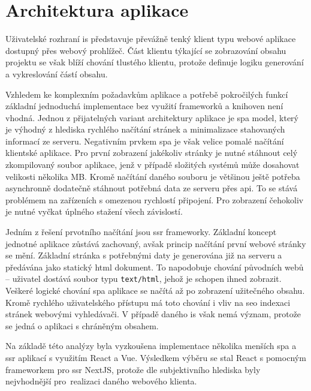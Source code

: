 

\section{Architektura aplikace}

Uživatelské rozhraní \gls{is} představuje převážně tenký klient typu webové aplikace dostupný přes webový prohlížeč. Část klientu týkající se zobrazování obsahu projektu se však blíží chování tlustého klientu, protože definuje logiku generování a vykreslování částí obsahu.

Vzhledem ke komplexním požadavkům aplikace a potřebě pokročilých funkcí základní jednoduchá implementace bez využití frameworků a knihoven není vhodná. Jednou z přijatelných variant architektury aplikace je \gls{spa} model, který je výhodný z hlediska rychlého načítání stránek a minimalizace stahovaných informací ze serveru. Negativním prvkem \gls{spa} je však velice pomalé načítání klientské aplikace. Pro první zobrazení jakékoliv stránky je nutné stáhnout celý zkompilovaný soubor aplikace, jenž v případě složitých systémů může dosahovat velikosti několika MB. Kromě načítání daného souboru je většinou ještě potřeba asynchronně dodatečně stáhnout potřebná data ze serveru přes \gls{api}. To se stává problémem na zařízeních s omezenou rychlostí připojení. Pro zobrazení čehokoliv je nutné vyčkat úplného stažení všech závislostí.

Jedním z řešení prvotního načítání jsou \gls{ssr} frameworky. Základní koncept jednotné aplikace zůstává zachovaný, avšak princip načítání první webové stránky se mění. Základní stránka s potřebnými daty je generována již na serveru a předávána jako statický \gls{html} dokument. To napodobuje chování původních webů -- uživatel dostává soubor typu \texttt{text/html}, jehož je schopen ihned zobrazit. Veškeré logické chování \gls{spa} aplikace se načítá až po zobrazení užitečného obsahu. Kromě rychlého uživatelského přístupu má toto chování i vliv na \gls{seo} indexaci stránek webovými vyhledávači. V případě daného \gls{is} však nemá význam, protože se jedná o aplikaci s chráněným obsahem.

Na základě této analýzy byla vyzkoušena implementace několika menších \gls{spa} a \gls{ssr} aplikací s využitím React a Vue. Výsledkem výběru se stal React s pomocným frameworkem pro \gls{ssr} NextJS, protože dle subjektivního hlediska byly nejvhodnější pro~realizaci daného webového klienta.


